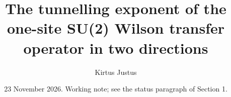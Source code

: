 
\title[Tunnelling exponent, one site, two directions]{The tunnelling exponent of the one-site SU(2) Wilson transfer operator in two directions}
\author{Kirtus Justus}
\address{Theoretical Physicist, Port Coquitlam, British Columbia, Canada}
\date{23 November 2026. Working note; see the status paragraph of Section 1.}

\maketitle



